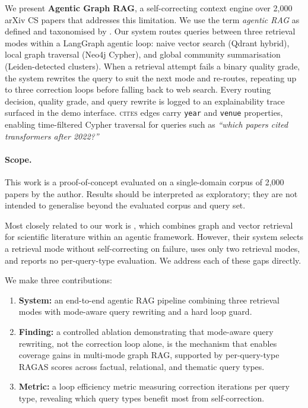 \documentclass[11pt]{article}
\begin{document}
We present \textbf{Agentic Graph RAG}, a self-correcting context engine
over 2,000 arXiv CS papers that addresses this limitation. We use the term
\textit{agentic RAG} as defined and taxonomised by
\citet{singh2025agenticrag}. Our system routes queries between three
retrieval modes within a LangGraph agentic loop: naive vector search
(Qdrant hybrid), local graph traversal (Neo4j Cypher), and global community
summarisation (Leiden-detected clusters). When a retrieval attempt fails a
binary quality grade, the system rewrites the query to suit the next mode
and re-routes, repeating up to three correction loops before falling back
to web search. Every routing decision, quality grade, and query rewrite is
logged to an explainability trace surfaced in the demo interface.
\textsc{cites} edges carry \texttt{year} and \texttt{venue} properties,
enabling time-filtered Cypher traversal for queries such as \textit{``which
papers cited transformers after 2022?''}

\paragraph{Scope.}
This work is a proof-of-concept evaluated on a single-domain corpus of
2,000 papers by the author. Results should be interpreted as exploratory;
they are not intended to generalise beyond the evaluated corpus and query set.

Most closely related to our work is \citet{nagori2025opensource}, which
combines graph and vector retrieval for scientific literature within an
agentic framework. However, their system selects a retrieval mode without
self-correcting on failure, uses only two retrieval modes, and reports no
per-query-type evaluation. We address each of these gaps directly.

We make three contributions:
\begin{enumerate}
  \item \textbf{System:} an end-to-end agentic RAG pipeline combining
        three retrieval modes with mode-aware query rewriting and a hard
        loop guard.
  \item \textbf{Finding:} a controlled ablation demonstrating that
        mode-aware query rewriting, not the correction loop alone, is the
        mechanism that enables coverage gains in multi-mode graph RAG,
        supported by per-query-type RAGAS scores across factual,
        relational, and thematic query types.
  \item \textbf{Metric:} a loop efficiency metric measuring correction
        iterations per query type, revealing which query types benefit
        most from self-correction.
\end{enumerate}
\end{document}
